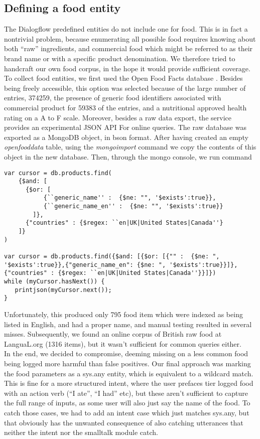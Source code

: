 \subsection{Defining a food entity}
The Dialogflow predefined entities do not include one for food. This is in fact a nontrivial problem, because enumerating all possible food requires knowing about both ``raw'' ingredients, and commercial food which might be referred to as their brand name or with a specific product denomination. We therefore tried to handcraft our own food corpus, in the hope it would provide sufficient coverage.
To collect food entities, we first used the Open Food Facts database \cite{openfoodfacts}. Besides being freely accessible, this option was selected because of the large number of entries, 374259, the presence of generic food identifiers associated with commercial product for 59383 of the entries, and a nutritional approved health rating on a A to F scale. Moreover, besides a raw data export, the service provides an experimental JSON API For online queries. 
The raw database was exported as a MongoDB \cite{mongo} object, in bson format. After having created an empty \textit{openfooddata} table, using the \textit{mongoimport} command we copy the contents of this object in the new database. Then, through the mongo console, we run command
\begin{lstlisting}
var cursor = db.products.find( 
    {$and: [
      {$or: [
           {``generic_name'' :  {$ne: "", '$exists':true}},
           {``generic_name_en'' :  {$ne: "", '$exists':true}}
        ]},
      {"countries" : {$regex: ``en|UK|United States|Canada''}
    ]}
)

var cursor = db.products.find({$and: [{$or: [{"" :  {$ne: ", '$exists':true}},{"generic_name_en": {$ne: ", '$exists':true}}]}, {"countries" : {$regex: ``en|UK|United States|Canada''}}]})
while (myCursor.hasNext()) {
   printjson(myCursor.next());
}
\end{lstlisting}
Unfortunately, this produced only 795 food item which were indexed as being listed in English, and had a proper name, and manual testing resulted in several misses. Subsequently, we found an online corpus of British raw food at LanguaL.org \cite{}(1316 items), but it wasn't sufficient for common queries either. \\
In the end, we decided to compromise, deeming missing on a less common food being logged more harmful than false positives. Our final approach was marking the food parameters as a sys.any entity, which is equivalent to a wildcard match. This is fine for a more structured intent, where the user prefaces tier logged food with an action verb (``I ate'', ``I had'' etc), but these aren't sufficient to capture the full range of inputs, as some user will also just say the name of the food. To catch those cases, we had to add an intent case which just matches sys.any, but that obviously has the unwanted consequence of also catching utterances that neither the intent nor the smalltalk module catch.
